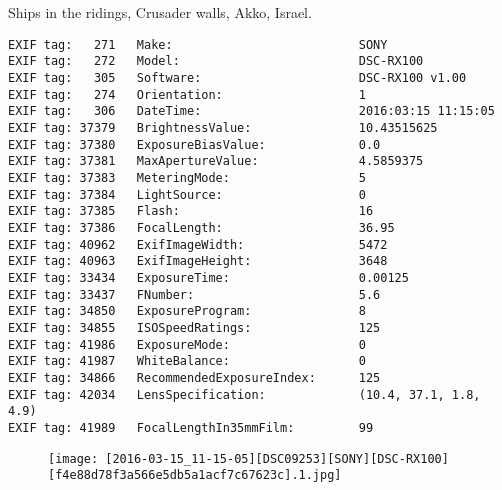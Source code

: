 \section{\protect{}}
\noindent Ships in the ridings, Crusader walls, Akko, Israel.
\noindent
\begin{lstlisting}
EXIF tag:   271   Make:                          SONY
EXIF tag:   272   Model:                         DSC-RX100
EXIF tag:   305   Software:                      DSC-RX100 v1.00
EXIF tag:   274   Orientation:                   1
EXIF tag:   306   DateTime:                      2016:03:15 11:15:05
EXIF tag: 37379   BrightnessValue:               10.43515625
EXIF tag: 37380   ExposureBiasValue:             0.0
EXIF tag: 37381   MaxApertureValue:              4.5859375
EXIF tag: 37383   MeteringMode:                  5
EXIF tag: 37384   LightSource:                   0
EXIF tag: 37385   Flash:                         16
EXIF tag: 37386   FocalLength:                   36.95
EXIF tag: 40962   ExifImageWidth:                5472
EXIF tag: 40963   ExifImageHeight:               3648
EXIF tag: 33434   ExposureTime:                  0.00125
EXIF tag: 33437   FNumber:                       5.6
EXIF tag: 34850   ExposureProgram:               8
EXIF tag: 34855   ISOSpeedRatings:               125
EXIF tag: 41986   ExposureMode:                  0
EXIF tag: 41987   WhiteBalance:                  0
EXIF tag: 34866   RecommendedExposureIndex:      125
EXIF tag: 42034   LensSpecification:             (10.4, 37.1, 1.8, 4.9)
EXIF tag: 41989   FocalLengthIn35mmFilm:         99

\end{lstlisting}
\clearpage
\begin{figure}
\raggedleft
\texttt{[image: [2016-03-15\_11-15-05][DSC09253][SONY][DSC-RX100][f4e88d78f3a566e5db5a1acf7c67623c].1.jpg]}
\end{figure}


\clearpage
